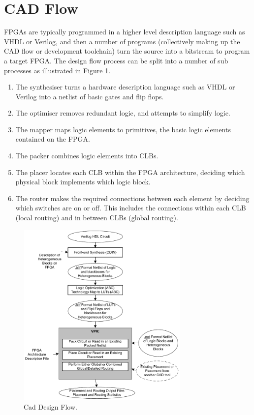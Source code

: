 \documentclass[12pt,final,oneside]{memoir} %
\begin{document}
\section{\acs{CAD} Flow}
\acp{FPGA} are typically programmed in a higher level description language such as VHDL or Verilog, and then a number of programs (collectively making up the \ac{CAD} flow or development toolchain) turn the source into a bitstream to program a target \ac{FPGA}.
The design flow process can be split into a number of sub processes as illustrated in Figure \ref{CADFlow}\cite{VPRBook,VPRManual,FPGAArch}.
\begin{enumerate}
    \item The synthesiser turns a hardware description language such as VHDL or Verilog into a netlist of basic gates and flip flops.
    \item The optimiser removes redundant logic, and attempts to simplify logic.
    \item The mapper maps logic elements to primitives, the basic logic elements contained on the \ac{FPGA}.
    \item The packer combines logic elements into \acp{CLB}.
    \item The placer locates each \ac{CLB} within the \ac{FPGA} architecture, deciding which physical block implements which logic block.
    \item The router makes the required connections between each element by deciding which switches are on or off. This includes the connections within each \ac{CLB} (local routing) and in between \acp{CLB} (global routing).
\end{enumerate}

\begin{figure}
    \begin{center}
        \includegraphics[width=0.75\textwidth]{images/vpr-cad.png}
        \caption{Cad Design Flow.\cite{VPRManual}}
        \label{CADFlow}
    \end{center}
\end{figure}
\end{document}
